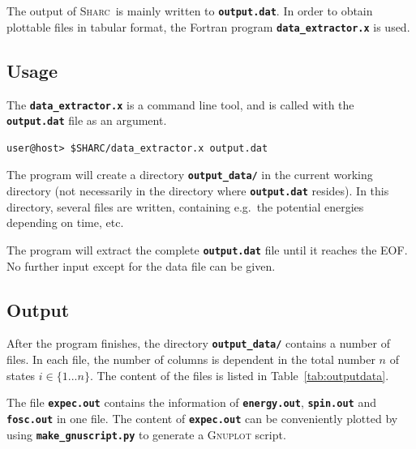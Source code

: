 \documentclass[a4paper,11pt,DIV=15,openany,twoside=false]{scrbook}
\newcommand{\sharc}{\textsc{Sharc}}
\newcommand{\ttt}[1]{\textbf{\texttt{#1}}}
\begin{document}
The output of \sharc\ is mainly written to \ttt{output.dat}. In order to obtain plottable files in tabular format, the Fortran program \ttt{data\_extractor.x} is used.

\subsection{Usage}

The \ttt{data\_extractor.x} is a command line tool, and is called with the \ttt{output.dat} file as an argument.
\begin{verbatim}
user@host> $SHARC/data_extractor.x output.dat
\end{verbatim}
The program will create a directory \ttt{output\_data/} in the current working directory (not necessarily in the directory where \ttt{output.dat} resides). In this directory, several files are written, containing e.g.\ the potential energies depending on time, etc.

The program will extract the complete \ttt{output.dat} file until it reaches the EOF. No further input except for the data file can be given.

\subsection{Output}

After the program finishes, the directory \ttt{output\_data/} contains a number of files. In each file, the number of columns is dependent in the total number $n$ of states $i\in\{1...n\}$. The content of the files is listed in Table~\ref{tab:outputdata}.

The file \ttt{expec.out} contains the information of \ttt{energy.out}, \ttt{spin.out} and \ttt{fosc.out} in one file. The content of \ttt{expec.out} can be conveniently plotted by using \ttt{make\_gnuscript.py} to generate a \textsc{Gnuplot} script.
\end{document}

